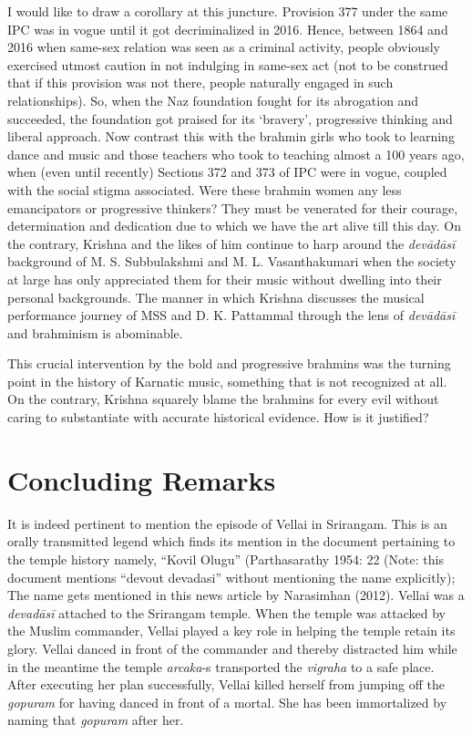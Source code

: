 I would like to draw a corollary at this juncture. Provision 377 under the same IPC was in vogue until it got decriminalized in 2016. Hence, between 1864 and 2016 when same-sex relation was seen as a criminal activity, people obviously exercised utmost caution in not indulging in same-sex act (not to be construed that if this provision was not there, people naturally engaged in such relationships). So, when the Naz foundation fought for its abrogation and succeeded, the foundation got praised for its ‘bravery’, progressive thinking and liberal approach. Now contrast this with the brahmin girls who took to learning dance and music and those teachers who took to teaching almost a 100 years ago, when (even until recently) Sections 372 and 373 of IPC were in vogue, coupled with the social stigma associated. Were these brahmin women any less emancipators or progressive thinkers? They must be venerated for their courage, determination and dedication due to which we have the art alive till this day. On the contrary, Krishna and the likes of him continue to harp around the \textit{devādāsī }background of M. S. Subbulakshmi and M. L. Vasanthakumari when the society at large has only appreciated them for their music without dwelling into their personal backgrounds. The manner in which Krishna discusses the musical performance journey of MSS and D. K. Pattammal through the lens of \textit{devādāsī }and brahminism is abominable.

This crucial intervention by the bold and progressive brahmins was the turning point in the history of Karnatic music, something that is not recognized at all. On the contrary, Krishna squarely blame the brahmins for every evil without caring to substantiate with accurate historical evidence. How is it justified?


\section*{Concluding Remarks}

It is indeed pertinent to mention the episode of Vellai in Srirangam. This is an orally transmitted legend which finds its mention in the document pertaining to the temple history namely, “Kovil Olugu” (Parthasarathy 1954: 22 (Note: this document mentions “devout devadasi” without mentioning the name explicitly); The name gets mentioned in this news article by Narasimhan (2012). Vellai was a \textit{devadāsī} attached to the Srirangam temple. When the temple was attacked by the Muslim commander, Vellai played a key role in helping the temple retain its glory. Vellai danced in front of the commander and thereby distracted him while in the meantime the temple \textit{arcaka}-s transported the \textit{vigraha} to a safe place. After executing her plan successfully, Vellai killed herself from jumping off the \textit{gopuram} for having danced in front of a mortal. She has been immortalized by naming that \textit{gopuram} after her.

